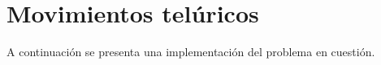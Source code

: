 \section{Movimientos telúricos}

A continuación se presenta una implementación del problema en cuestión.

